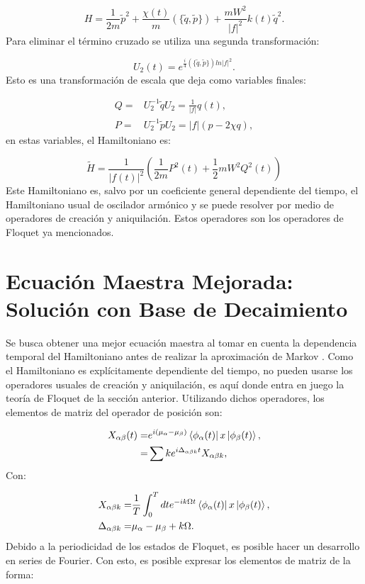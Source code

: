 \documentclass[a4paper,10pt]{report}
\begin{document}
\begin{equation}
 H = \frac{1}{2m}\tilde{p}^2 + \frac{\chi(t)}{m}(\{\tilde{q},\tilde{p}\}) + \frac{mW^2}{|f|^2}k(t)\tilde{q}^2.
\end{equation}Para eliminar el término cruzado se utiliza una segunda transformación:

\begin{equation}
U_2(t)=e^{\frac{i}{4}(\{\tilde{q},\tilde{p}\})ln|f|^2}.
\end{equation}Esto es una transformación de escala que deja como variables finales:

\begin{align}
Q=&U_2^{-1}\tilde{q}U_2 =\frac{1}{|f|}q(t),\\
P=&U_2^{-1}\tilde{p}U_2 = |f|(p-2\chi q), 
\end{align} en estas variables, el Hamiltoniano es:

\begin{equation}\label{QTDHO}
\tilde{H} = \frac{1}{|f(t)|^2}(\frac{1}{2m}P^2(t)+\frac{1}{2}mW^2Q^2(t))
\end{equation}Este Hamiltoniano es, salvo por un coeficiente general dependiente del tiempo, el Hamiltoniano usual de oscilador armónico y se puede resolver por medio de operadores de creación y aniquilación. Estos operadores son los operadores de Floquet ya mencionados.

\section{Ecuación Maestra Mejorada: Solución con Base de Decaimiento}

Se busca obtener una mejor ecuación maestra al tomar en cuenta la dependencia temporal del Hamiltoniano antes de realizar la aproximación de Markov \cite{HanngiDQS}. Como el Hamiltoniano es explícitamente dependiente del tiempo, no pueden usarse los operadores usuales de creación y aniquilación, es aquí donde entra en juego la teoría de Floquet de la sección anterior. Utilizando dichos operadores, los elementos de matriz del operador de posición son:

\begin{align}
X_{\alpha \beta}(t) =& e^{i(\mu_{\alpha}-\mu_{\beta})}\Bra{\phi_{\alpha}(t)}x\Ket{\phi_{\beta}(t)},\\
=& \sum{k} e^{i\Delta_{\alpha\beta k}t} X_{\alpha\beta k},
\end{align}Con:

\begin{align*}
X_{\alpha\beta k} =& \frac{1}{T} \int_0^T dt e^{-ik\Omega t}\Bra{\phi_{\alpha}(t)}x\Ket{\phi_{\beta}(t)}, \\
\Delta_{\alpha \beta k} =& \mu_{\alpha}-\mu_{\beta} + k\Omega.
\end{align*}Debido a la periodicidad de los estados de Floquet, es posible hacer un desarrollo en series de Fourier. Con esto, es posible expresar los elementos de matriz de la forma:
\end{document}
